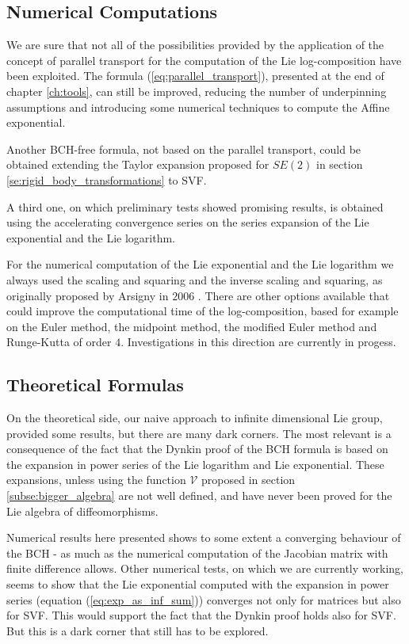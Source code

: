 \subsection{Numerical Computations} 

We are sure that not all of the possibilities provided by the application of the concept of parallel transport for the computation of the Lie log-composition have been exploited. The formula (\ref{eq:parallel_transport}), presented at the end of chapter \ref{ch:tools}, can still be improved, reducing the number of underpinning assumptions and introducing some numerical techniques to compute the Affine exponential.

Another BCH-free formula, not based on the parallel transport, could be obtained extending the Taylor expansion proposed for $SE(2)$ in section \ref{se:rigid_body_transformations} to SVF.

A third one, on which  preliminary tests showed promising results, is obtained using the accelerating convergence series \cite{cohen2000convergence} on the series expansion of the Lie exponential and the Lie logarithm. 

For the numerical computation of the Lie exponential and the Lie logarithm we always used the scaling and squaring and the inverse scaling and squaring, as originally proposed by Arsigny in $2006$ \cite{arsigny2006log}. There are other options available that could improve the computational time of the log-composition, based for example on the Euler method, the midpoint method, the modified Euler method and Runge-Kutta of order $4$. Investigations in this direction are currently in progess.


\subsection{Theoretical Formulas}

On the theoretical side, our naive approach to infinite dimensional Lie group, provided some results, but there are many dark corners. The most relevant is a consequence of the fact that the Dynkin proof of the BCH formula is based on the expansion in power series of the Lie logarithm and Lie exponential. These expansions, unless using the function $\mathcal{V}$ proposed in section \ref{subse:bigger_algebra} are not well defined, and have never been proved for the Lie algebra of diffeomorphisms.

Numerical results here presented shows to some extent a converging behaviour of the BCH - as much as the numerical computation of the Jacobian matrix with finite difference allows.
Other numerical tests, on which we are currently working, seems to show that the Lie exponential computed with the expansion in power series (equation (\ref{eq:exp_as_inf_sum})) converges not only for matrices but also for SVF. This would support the fact that the Dynkin proof holds also for SVF. But this is a dark corner that still has to be explored.

